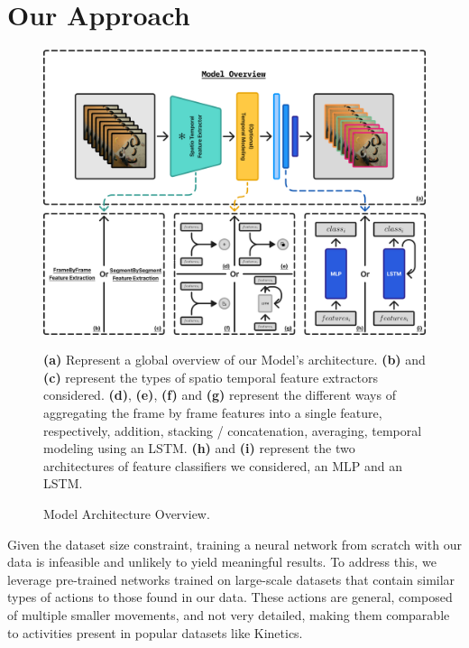 \section{Our Approach}

\begin{figure}[t]
    \centering
    \includegraphics[width=\textwidth]{../../assets/figures/model-overview.png}
    \caption{Model Architecture Overview.}
    \label{figure:model-architecture-overview}
    \medskip
    \small\par
    \textbf{(a)} Represent a global overview of our Model's architecture.
    \textbf{(b)} and \textbf{(c)} represent the types of spatio temporal feature extractors considered.
    \textbf{(d)}, \textbf{(e)}, \textbf{(f)} and \textbf{(g)} represent the different ways of aggregating the frame by frame features into a single feature, respectively, addition, stacking / concatenation, averaging, temporal modeling using an LSTM.
    \textbf{(h)} and \textbf{(i)} represent the two architectures of feature classifiers we considered, an MLP and an LSTM.
\end{figure}

Given the dataset size constraint, training a neural network from scratch with our data is infeasible and unlikely to yield meaningful results. To address this, we leverage pre-trained networks trained on large-scale datasets that contain similar types of actions to those found in our data. These actions are general, composed of multiple smaller movements, and not very detailed, making them comparable to activities present in popular datasets like Kinetics.

